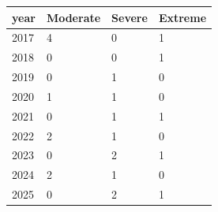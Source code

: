\begin{tabular}{llll}
\hline
year & Moderate & Severe & Extreme \\
\hline
2017 & 4 & 0 & 1 \\
2018 & 0 & 0 & 1 \\
2019 & 0 & 1 & 0 \\
2020 & 1 & 1 & 0 \\
2021 & 0 & 1 & 1 \\
2022 & 2 & 1 & 0 \\
2023 & 0 & 2 & 1 \\
2024 & 2 & 1 & 0 \\
2025 & 0 & 2 & 1 \\
\hline
\end{tabular}